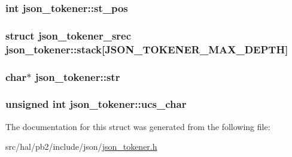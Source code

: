 \subsubsection[{\texorpdfstring{st\+\_\+pos}{st_pos}}]{\setlength{\rightskip}{0pt plus 5cm}int json\+\_\+tokener\+::st\+\_\+pos}\hypertarget{structjson__tokener_a8eed213c0a37d09c1df66c8567e44471}{}\label{structjson__tokener_a8eed213c0a37d09c1df66c8567e44471}
\subsubsection[{\texorpdfstring{stack}{stack}}]{\setlength{\rightskip}{0pt plus 5cm}struct {\bf json\+\_\+tokener\+\_\+srec} json\+\_\+tokener\+::stack\mbox{[}{\bf J\+S\+O\+N\+\_\+\+T\+O\+K\+E\+N\+E\+R\+\_\+\+M\+A\+X\+\_\+\+D\+E\+P\+TH}\mbox{]}}\hypertarget{structjson__tokener_a1499f97597246a18357b874e1805a678}{}\label{structjson__tokener_a1499f97597246a18357b874e1805a678}
\subsubsection[{\texorpdfstring{str}{str}}]{\setlength{\rightskip}{0pt plus 5cm}char$\ast$ json\+\_\+tokener\+::str}\hypertarget{structjson__tokener_a9772e2170322a19d8da6ce5d7dc46895}{}\label{structjson__tokener_a9772e2170322a19d8da6ce5d7dc46895}
\subsubsection[{\texorpdfstring{ucs\+\_\+char}{ucs_char}}]{\setlength{\rightskip}{0pt plus 5cm}unsigned int json\+\_\+tokener\+::ucs\+\_\+char}\hypertarget{structjson__tokener_a32fa73e43fb760e6845231a8482eb064}{}\label{structjson__tokener_a32fa73e43fb760e6845231a8482eb064}


The documentation for this struct was generated from the following file\+:\begin{DoxyCompactItemize}
\item 
src/hal/pb2/include/json/\hyperlink{json__tokener_8h}{json\+\_\+tokener.\+h}\end{DoxyCompactItemize}
